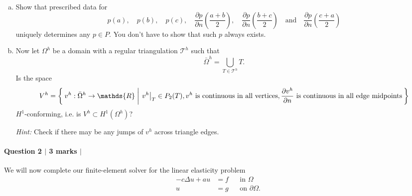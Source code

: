 \documentclass[10pt,letterpaper]{scrartcl}
\begin{document}
\begin{enumerate}[(a)]
\item Show that prescribed data for
\begin{equation*}
p(a), \quad
 p(b),\quad
 p(c),\quad
 \frac{\partial p}{\partial n}\left(\frac{a+b}{2}\right),\quad
 \frac{\partial p}{\partial n}\left(\frac{b+c}{2}\right)\quad \text{and} \quad
 \frac{\partial p}{\partial n}\left(\frac{c+a}{2}\right)
\end{equation*}
uniquely determines any $p \in P$. You don't have to show that such $p$ always exists.
\newpage

\item Now let $\Omega^h$ be a domain with a regular triangulation $\mathcal{T}^h$ such that
\begin{equation*}
\bar{\Omega}^h = \bigcup_{T\in \mathcal{T}^h} T.
\end{equation*}
Is the space
\begin{equation*}
V^h = \Set{v^h: \bar{\Omega}^h\to \mathds{R} | \left. v^h\right\rvert_T \in P_2(T), v^h \text{ is continuous in all vertices}, \frac{\partial v^h}{\partial n} \text{ is continuous in all edge midpoints} }
\end{equation*}
$H^1$-conforming, i.e. is $V^h \subset H^1(\Omega ^h)$?

\emph{Hint:} Check if there may be any jumps of $v^h$ across triangle edges.
\end{enumerate}
\newpage

\paragraph*{Question 2 $\vert$ 3 marks $\vert$ \faFileCodeO \: \faFilePictureO \: \faFilePdfO}

We will now complete our finite-element solver for the linear elasticity problem
\begin{equation}\label{eq:le}
\begin{aligned}
-c\Delta u + a u &= f &&\text{in } \Omega\\
u &= g && \text{on } \partial\Omega.
\end{aligned}
\end{equation}
\end{document}
